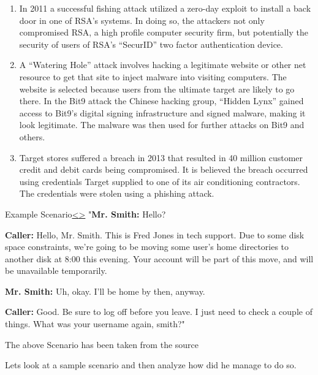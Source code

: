 \documentclass[12pt]{extarticle}
\newenvironment{instructionblock}{\Large\bgroup}{\egroup}
\begin{document}
\begin{enumerate}
	\item In 2011 a successful fishing attack utilized a zero-day exploit to install a back door in one of RSA's systems.  In doing so, the attackers not only compromised RSA, a high profile computer security firm, but potentially the security of users of RSA's ``SecurID'' two factor authentication device. \cite{Best7-3}
	\item A ``Watering Hole'' attack involves hacking a legitimate website or other net resource to get that site to inject malware into visiting computers.  The website is selected because users from the ultimate target are likely to go there.  In the Bit9 attack the Chinese hacking group, ``Hidden Lynx'' gained access to Bit9's digital signing infrastructure and signed malware, making it look legitimate.  The malware was then used for further attacks on Bit9 and others.\cite{Best7-4}
	\item Target stores suffered a breach in 2013 that resulted in 40 million customer credit and debit cards being compromised.  It is believed the breach occurred using credentials Target supplied to one of its air conditioning contractors.  The credentials were stolen using a phishing attack. \cite{Best7-7}
\end{enumerate}

\pagebreak
\begin{slide}{Example Scenario}{\hyperref[slide 4]{\textless}\hyperref[slide 6]{\textgreater}}
	\begin{instructionblock}
		"\textbf{Mr. Smith:} Hello?
	
		\textbf{Caller:} Hello, Mr. Smith. This is Fred Jones in tech support. Due to some disk space constraints, we’re going to be moving some user’s home directories to another disk at 8:00 this evening. Your account
		will be part of this move, and will be unavailable temporarily.
		
		\textbf{Mr. Smith:} Uh, okay. I’ll be home by then, anyway.
		
		\textbf{Caller:} Good. Be sure to log off before you leave. I just need to check a couple of things. What was your username again, smith?"
		
		The above Scenario has been taken from the source\cite{b6}
		
	\end{instructionblock}
\end{slide}
		
		Lets look at a sample scenario and then analyze how did he manage to do so.
	
\end{document}

